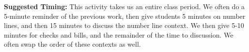 \documentclass[nooutcomes,noauthor,handout]{ximera}
\begin{document}
\begin{instructorNotes}
{\bf Suggested Timing:} This activity takes us an entire class period.  We often do a 5-minute reminder of the previous work, then give students 5 minutes on number lines, and then 15 minutes to discuss the number line context.  We then give 5-10 minutes for checks and bills, and the remainder of the time to discussion.  We often swap the order of these contexts as well.
\end{instructorNotes}
\end{document}
